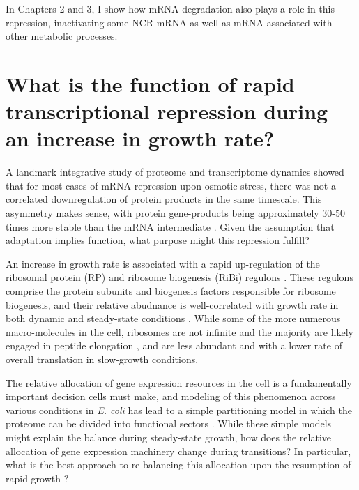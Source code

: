 In Chapters 2 and 3, I show how mRNA
degradation also plays a role in this repression, inactivating some
NCR mRNA as well as mRNA associated with other metabolic processes.

\section{What is the function of rapid transcriptional repression
during an increase in growth rate?}

A landmark integrative study of proteome and transcriptome dynamics 
\parencite{lee2011dynamic} showed that
for most cases of mRNA repression upon osmotic stress, there was not
a correlated downregulation of protein products in the same timescale.
This asymmetry makes sense, with protein gene-products being 
approximately 30-50 times more stable than the mRNA intermediate 
\parencite{christiano2014global}. 
Given the assumption that adaptation implies function, what purpose
might this repression fulfill?

An increase in growth rate is associated with a rapid
up-regulation of the ribosomal protein (RP)
and ribosome biogenesis (RiBi) regulons
\parencite{griffioen1996ribosomal,jorgensen2004dynamic}. 
These regulons comprise the protein subunits and biogenesis factors
responsible for ribosome biogenesis, and their relative abudnance 
is well-correlated with 
growth rate in both dynamic and steady-state conditions 
\parencite{brauer2008coordination,airoldi2009predicting}.
While some of the more numerous macro-molecules in the cell, 
ribosomes are not infinite and the majority are likely engaged in 
peptide elongation
\parencite{shah2013rate,von2008quantitative,boehlke1975cellular},
and are less abundant 
\parencite{kief1981coordinate,powers1999regulation}
and with a lower rate of overall translation
\parencite{waldron1977evidence}
in slow-growth conditions.

The relative allocation of gene expression resources in the cell is a
fundamentally important decision cells must make, and modeling
of this phenomenon across various conditions in \textit{E. coli} has
lead to a simple partitioning model in which the proteome can be
divided into functional sectors
\parencite{scott2010interdependence,scott2014emergence}.
While these simple models might explain the balance during
steady-state growth, how does the relative allocation of gene
expression machinery change during transitions?
In particular, what is the best approach to re-balancing this
allocation upon the resumption of rapid growth
\parencite{erickson2017global}?


